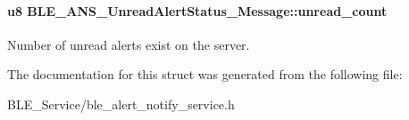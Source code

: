 \paragraph[{\texorpdfstring{unread\+\_\+count}{unread_count}}]{\setlength{\rightskip}{0pt plus 5cm}u8 B\+L\+E\+\_\+\+A\+N\+S\+\_\+\+Unread\+Alert\+Status\+\_\+\+Message\+::unread\+\_\+count}\hypertarget{struct_b_l_e___a_n_s___unread_alert_status___message_a520189c6388ef43a961e8d52b872843a}{}\label{struct_b_l_e___a_n_s___unread_alert_status___message_a520189c6388ef43a961e8d52b872843a}
Number of unread alerts exist on the server. 

The documentation for this struct was generated from the following file\+:\begin{DoxyCompactItemize}
\item 
B\+L\+E\+\_\+\+Service/ble\+\_\+alert\+\_\+notify\+\_\+service.\+h\end{DoxyCompactItemize}
